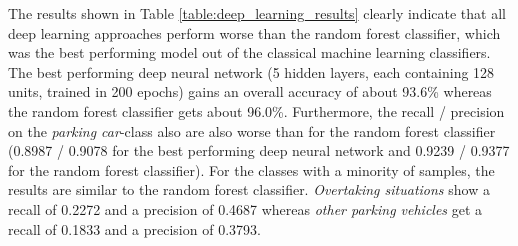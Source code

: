 \begin{table}



\caption{Overall accuracy and results for the \emph{parking car}-class of different configurations of deep learning models applied on the full and filtered dataset compared to the best classical machine learning model (random forest).}
\label{table:deep_learning_results}
\end{table}


The results shown in Table \ref{table:deep_learning_results} clearly indicate that all deep learning approaches perform worse than the random forest classifier, which was the best performing model out of the classical machine learning classifiers. The best performing deep neural network (5 hidden layers, each containing 128 units, trained in 200 epochs) gains an overall accuracy of about 93.6\% whereas the random forest classifier gets about 96.0\%. Furthermore, the recall / precision on the \emph{parking car}-class also are also worse than for the random forest classifier (0.8987 / 0.9078 for the best performing deep neural network and 0.9239 / 0.9377 for the random forest classifier). For the classes with a minority of samples, the results are similar to the random forest classifier. \emph{Overtaking situations} show a recall of 0.2272 and a precision of 0.4687 whereas \emph{other parking vehicles} get a recall of 0.1833 and a precision of 0.3793.

